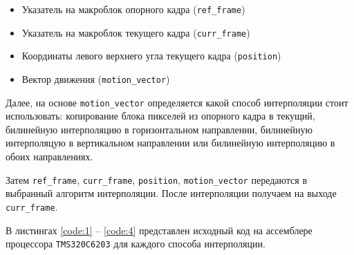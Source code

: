 \begin{itemize}
	\item Указатель на макроблок опорного кадра (\verb+ref_frame+)
	\item Указатель на макроблок текущего кадра (\verb+curr_frame+)
	\item Координаты левого верхнего угла текущего кадра (\verb+position+)
	\item Вектор движения (\verb+motion_vector+)
\end{itemize}

Далее, на основе \verb+motion_vector+ определяется какой способ интерполяции стоит использовать: копирование блока пикселей из опорного кадра в текущий, билинейную интерполяцию в горизонтальном направлении, билинейную интерполяцую в вертикальном направлении или билинейную интерполяцию в обоих направлениях.

Затем \verb+ref_frame+, \verb+curr_frame+, \verb+position+, \verb+motion_vector+ передаются в выбранный алгоритм интерполяции. После интерполяции получаем на выходе \verb+curr_frame+.

В листингах \ref{code:1} -- \ref{code:4} представлен исходный код на ассемблере процессора \verb+TMS320C6203+ для каждого способа интерполяции. 






